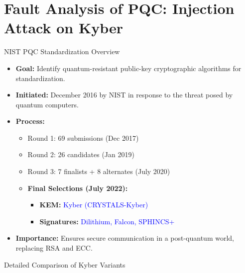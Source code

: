 \documentclass{beamer}
\newenvironment{tres important}[2][]{
	\setkeys{EmphEqEnv}{#2}
	\setkeys{EmphEqOpt}{box={\setlength{\fboxsep}{10pt}\fcolorbox{myNewColorA}{white}},#1}
	\EmphEqMainEnv}
{\endEmphEqMainEnv}
\begin{document}
\section{Fault Analysis of PQC: Injection Attack on Kyber}
\begin{frame}{NIST PQC Standardization Overview}
  \small
  \begin{itemize}
    \item \textbf{Goal:} Identify quantum-resistant public-key cryptographic algorithms for standardization.
    
    \item \textbf{Initiated:} December 2016 by NIST in response to the threat posed by quantum computers.

    \item \textbf{Process:}
    \begin{itemize}
      \item Round 1: 69 submissions (Dec 2017)
      \item Round 2: 26 candidates (Jan 2019)
      \item Round 3: 7 finalists + 8 alternates (July 2020)
      \item \textbf{Final Selections (July 2022):}
      \begin{itemize}
        \item \textbf{KEM:} \textcolor{blue}{Kyber (CRYSTALS-Kyber)}
        \item \textbf{Signatures:} \textcolor{blue}{Dilithium, Falcon, SPHINCS+}
      \end{itemize}
    \end{itemize}

    \item \textbf{Importance:} Ensures secure communication in a post-quantum world, replacing RSA and ECC.
  \end{itemize}
\end{frame}

\begin{frame}{Detailed Comparison of Kyber Variants}
  \centering
\end{frame}
\end{document}
